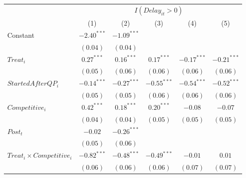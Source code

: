 \documentclass[
]{article}
\begin{document}
\begin{table}
\begin{center}
\begin{tabular}{l c c c c c}
\hline
 & \multicolumn{5}{c}{$I(Delay_{it}>0)$} \\
\cline{2-6}
 & (1) & (2) & (3) & (4) & (5) \\
\hline
Constant                                                             & $-2.40^{***}$ & $-1.09^{***}$ &               &               &               \\
                                                                     & $(0.04)$      & $(0.04)$      &               &               &               \\
$Treat_i$                                                            & $0.27^{***}$  & $0.16^{***}$  & $0.17^{***}$  & $-0.17^{***}$ & $-0.21^{***}$ \\
                                                                     & $(0.05)$      & $(0.06)$      & $(0.06)$      & $(0.06)$      & $(0.06)$      \\
$StartedAfterQP_i$                                                   & $-0.14^{***}$ & $-0.27^{***}$ & $-0.55^{***}$ & $-0.54^{***}$ & $-0.52^{***}$ \\
                                                                     & $(0.05)$      & $(0.05)$      & $(0.06)$      & $(0.06)$      & $(0.06)$      \\
$Competitive_i$                                                      & $0.42^{***}$  & $0.18^{***}$  & $0.20^{***}$  & $-0.08$       & $-0.07$       \\
                                                                     & $(0.04)$      & $(0.04)$      & $(0.05)$      & $(0.05)$      & $(0.05)$      \\
$Post_t$                                                             & $-0.02$       & $-0.26^{***}$ &               &               &               \\
                                                                     & $(0.05)$      & $(0.06)$      &               &               &               \\
$Treat_i \times Competitive_i$                                       & $-0.82^{***}$ & $-0.48^{***}$ & $-0.49^{***}$ & $-0.01$       & $0.01$        \\
                                                                     & $(0.06)$      & $(0.06)$      & $(0.06)$      & $(0.07)$      & $(0.07)$      \\

\end{tabular}
\end{center}
\end{table}
\end{document}

